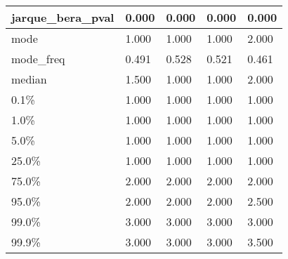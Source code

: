 \begin{table}[H]
\begin{tabular}{|l|m{10em}|m{10em}|m{10em}|m{10em}|}
\hline jarque\_bera\_pval & 0.000 & 0.000 & 0.000 & 0.000 \\
\hline mode & 1.000 & 1.000 & 1.000 & 2.000 \\
\hline mode\_freq & 0.491 & 0.528 & 0.521 & 0.461 \\
\hline median & 1.500 & 1.000 & 1.000 & 2.000 \\
\hline 0.1\% & 1.000 & 1.000 & 1.000 & 1.000 \\
\hline 1.0\% & 1.000 & 1.000 & 1.000 & 1.000 \\
\hline 5.0\% & 1.000 & 1.000 & 1.000 & 1.000 \\
\hline 25.0\% & 1.000 & 1.000 & 1.000 & 1.000 \\
\hline 75.0\% & 2.000 & 2.000 & 2.000 & 2.000 \\
\hline 95.0\% & 2.000 & 2.000 & 2.000 & 2.500 \\
\hline 99.0\% & 3.000 & 3.000 & 3.000 & 3.000 \\
\hline 99.9\% & 3.000 & 3.000 & 3.000 & 3.500 \\
\hline
\end{tabular}
\end{table}
